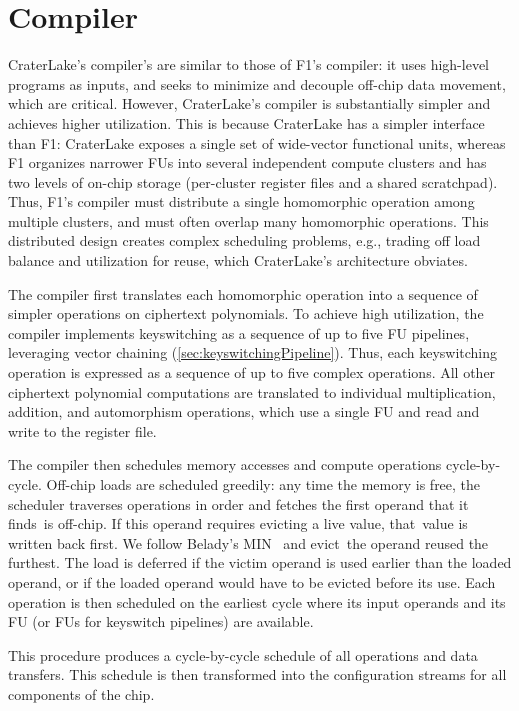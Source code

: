 \section{Compiler}\label{sec:algorithmicInsights}
\label{sec:compiler}

CraterLake's compiler's are similar to those of F1's compiler: it uses
high-level programs as inputs, and seeks to minimize and decouple off-chip data
movement, which are critical. However, CraterLake's compiler is substantially
simpler and achieves higher utilization. This is because CraterLake has a
simpler interface than F1: CraterLake exposes a single set of wide-vector
functional units, whereas F1 organizes narrower FUs into several independent
compute clusters and has two levels of on-chip storage (per-cluster register
files and a shared scratchpad). Thus, F1's compiler must distribute a single
homomorphic operation among multiple clusters, and must often overlap many
homomorphic operations. This distributed design creates complex scheduling
problems, e.g., trading off load balance and utilization for reuse, which
CraterLake's architecture obviates.

The compiler first translates each homomorphic operation into a sequence of
simpler operations on ciphertext polynomials. To achieve high utilization, the
compiler implements keyswitching as a sequence of up to five FU pipelines,
leveraging vector chaining (\autoref{sec:keyswitchingPipeline}). Thus, each
keyswitching operation is expressed as a sequence of up to five complex
operations. All other ciphertext polynomial computations are translated to
individual multiplication, addition, and automorphism operations, which use a
single FU and read and write to the register file.

The compiler then schedules memory accesses and compute operations
cycle-by-cycle. Off-chip loads are scheduled greedily: any time the memory is
free, the scheduler traverses operations in order and fetches the first operand
that it finds~is off-chip. If this operand requires evicting a live value,
that~value is written back first. We follow Belady's MIN~\cite{belady1966study}
and evict~the operand reused the furthest. The load is deferred if the victim
operand is used earlier than the loaded operand, or if the loaded operand would
have to be evicted before its use. Each operation is then scheduled on the
earliest cycle where its input operands and its FU (or FUs for keyswitch
pipelines) are available.

This procedure produces a cycle-by-cycle schedule of all operations and data
transfers. This schedule is then transformed into the configuration streams for
all components of the chip.

